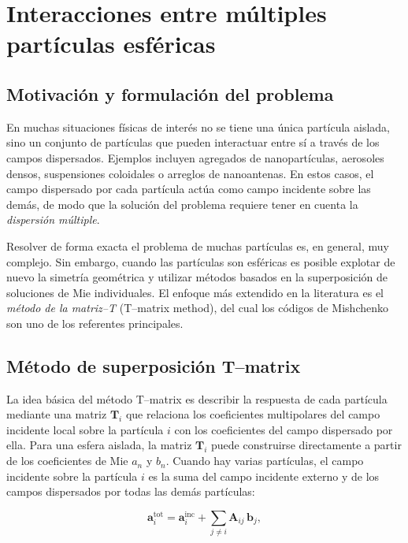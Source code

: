 \documentclass[12pt,a4paper]{article}
\begin{document}
\section{Interacciones entre múltiples partículas esféricas}

\subsection{Motivación y formulación del problema}

En muchas situaciones físicas de interés no se tiene una única partícula aislada, sino un conjunto de partículas que pueden interactuar entre sí a través de los campos dispersados.
Ejemplos incluyen agregados de nanopartículas, aerosoles densos, suspensiones coloidales o arreglos de nanoantenas.
En estos casos, el campo dispersado por cada partícula actúa como campo incidente sobre las demás, de modo que la solución del problema requiere tener en cuenta la \emph{dispersión múltiple}.

Resolver de forma exacta el problema de muchas partículas es, en general, muy complejo.
Sin embargo, cuando las partículas son esféricas es posible explotar de nuevo la simetría geométrica y utilizar métodos basados en la superposición de soluciones de Mie individuales.
El enfoque más extendido en la literatura es el \emph{método de la matriz--T} (T--matrix method), del cual los códigos de Mishchenko son uno de los referentes principales.

\subsection{Método de superposición T--matrix}

La idea básica del método T--matrix es describir la respuesta de cada partícula mediante una matriz $\mathbf{T}_i$ que relaciona los coeficientes multipolares del campo incidente local
sobre la partícula $i$ con los coeficientes del campo dispersado por ella.
Para una esfera aislada, la matriz $\mathbf{T}_i$ puede construirse directamente a partir de los coeficientes de Mie $a_n$ y $b_n$.
Cuando hay varias partículas, el campo incidente sobre la partícula $i$ es la suma del campo incidente externo y de los campos dispersados por todas las demás partículas:

\begin{equation}
  \mathbf{a}_i^{\text{tot}} = \mathbf{a}_i^{\text{inc}} + \sum_{j \neq i} \mathbf{A}_{ij}\,\mathbf{b}_j,
\end{equation}
\end{document}

